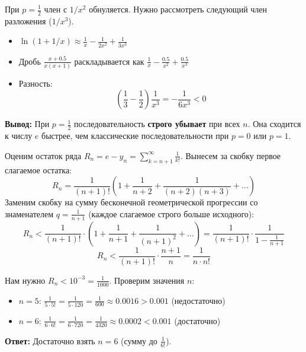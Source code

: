 \begin{tcolorbox}[title=Случай p = 1/2]
	При $p=\frac{1}{2}$ член с $1/x^2$ обнуляется. Нужно рассмотреть следующий член разложения ($1/x^3$).
	\begin{itemize}
		\item $\ln(1+1/x) \approx \frac{1}{x} - \frac{1}{2x^2} + \frac{1}{3x^3}$
		\item Дробь $\frac{x+0.5}{x(x+1)}$ раскладывается как $\frac{1}{x} - \frac{0.5}{x^2} + \frac{0.5}{x^3}$
		\item Разность:
		$$ \left(\frac{1}{3} - \frac{1}{2}\right)\frac{1}{x^3} = -\frac{1}{6x^3} < 0 $$
	\end{itemize}
	\textbf{Вывод:} При $p=\frac{1}{2}$ последовательность \textbf{строго убывает} при всех $n$. Она сходится к числу $e$ быстрее, чем классические последовательности при $p=0$ или $p=1$.
\end{tcolorbox}

\begin{tcolorbox}[title=3. Сколько слагаемых ряда нужно для точности $10^{-3}$?]
	Оценим остаток ряда $R_n = e - y_n = \sum_{k=n+1}^{\infty} \frac{1}{k!}$.
	Вынесем за скобку первое слагаемое остатка:
	\[ R_n = \frac{1}{(n+1)!} \left( 1 + \frac{1}{n+2} + \frac{1}{(n+2)(n+3)} + \dots \right) \]
	Заменим скобку на сумму бесконечной геометрической прогрессии со знаменателем $q = \frac{1}{n+1}$ (каждое слагаемое строго больше исходного):
	\[ R_n < \frac{1}{(n+1)!} \cdot \left( 1 + \frac{1}{n+1} + \frac{1}{(n+1)^2} + \dots \right) = \frac{1}{(n+1)!} \cdot \frac{1}{1 - \frac{1}{n+1}} \]
	\[ R_n < \frac{1}{(n+1)!} \cdot \frac{n+1}{n} = \frac{1}{n \cdot n!} \]
	
	Нам нужно $R_n < 10^{-3} = \frac{1}{1000}$. Проверим значения $n$:
	\begin{itemize}
		\item $n=5$: $\frac{1}{5 \cdot 5!} = \frac{1}{5 \cdot 120} = \frac{1}{600} \approx 0.0016 > 0.001$ (недостаточно)
		\item $n=6$: $\frac{1}{6 \cdot 6!} = \frac{1}{6 \cdot 720} = \frac{1}{4320} \approx 0.0002 < 0.001$ (достаточно)
	\end{itemize}
	\textbf{Ответ:} Достаточно взять $n=6$ (сумму до $\frac{1}{6!}$).
\end{tcolorbox}

